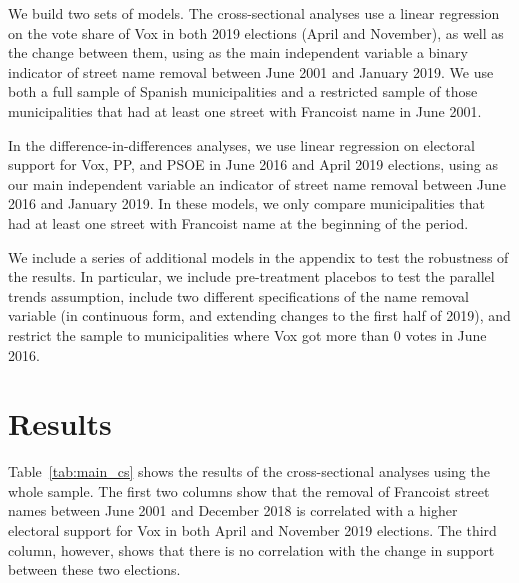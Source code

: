 \documentclass[12pt, notitlepage]{article}
\begin{document}
We build two sets of models.
The cross-sectional analyses use a linear regression on the vote share of Vox in both 2019 elections (April and November), as well as the change between them, using as the main independent variable a binary indicator of street name removal between June 2001 and January 2019.
We use both a full sample of Spanish municipalities and a restricted sample of those municipalities that had at least one street with Francoist name in June 2001.

In the difference-in-differences analyses, we use linear regression on electoral support for Vox, PP, and PSOE in June 2016 and April 2019 elections, using as our main independent variable an indicator of street name removal between June 2016 and January 2019.
In these models, we only compare municipalities that had at least one street with Francoist name at the beginning of the period.

We include a series of additional models in the appendix to test the robustness of the results.
In particular, we include pre-treatment placebos to test the parallel trends assumption, include two different specifications of the name removal variable (in continuous form, and extending changes to the first half of 2019), and restrict the sample to municipalities where Vox got more than 0 votes in June 2016.

\section*{Results}

Table~\ref{tab:main_cs} shows the results of the cross-sectional analyses using the whole sample.
The first two columns show that the removal of Francoist street names between June 2001 and December 2018 is correlated with a higher electoral support for Vox in both April and November 2019 elections.
The third column, however, shows that there is no correlation with the change in support between these two elections.
\end{document}
